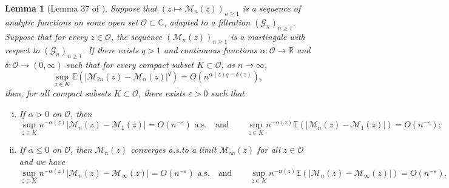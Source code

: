 \documentclass[11pt]{article}
\newtheorem{lemma}[theorem]{Lemma}
\numberwithin{equation}{section}
\def\vp{\varepsilon}
\def \R{\mathbb {R}}
\def \C{\mathbb{C}}
\def\E{\mathbb{E}}
\begin{document}
\begin{lemma}[Lemma 37 of \cite{Sen21}]\label{lemme 37}
	Suppose that $(z \mapsto \mathcal{M}_n(z))_{n\ge 1}$ is a sequence of analytic functions on some open set $\mathcal{O} \subset \C$, adapted to a filtration $(\mathcal{G}_n)_{n\ge 1}$. Suppose that for every $z \in \mathcal{O}$, the sequence $(\mathcal{M}_n(z))_{n\ge 1}$ is a martingale with respect to $(\mathcal{G}_n)_{n\ge 1}$. If there exists $q>1$ and continuous functions $\alpha:\mathcal{O} \to \R$ and $\delta: \mathcal{O} \to (0, \infty)$ such that for every compact subset $K \subset \mathcal{O}$, as $n\to \infty$,
	\[
	\sup_{z \in K}\E\left( \vert \mathcal{M}_{2n}(z)-\mathcal{M}_n(z) \vert^q \right) = O \left( n^{\alpha(z) q- \delta(z) }\right),
	\]
	then, for all compact subsets $K \subset \mathcal{O}$, there exists $\vp>0$ such that
	\begin{enumerate}[(i)]
		\item \label{item i lemme 37} If $\alpha>0$ on $\mathcal{O}$, then 
		\[
		\sup_{z \in K} n^{-\alpha(z)} \vert \mathcal{M}_n(z) - \mathcal{M}_1(z) \vert = O(n^{-\vp}) \text{ a.s.}\quad \text{and} \qquad  \sup_{z \in K} n^{-\alpha(z)}  \E\left(\vert \mathcal{M}_n(z) - \mathcal{M}_1(z) \vert  \right) = O(n^{-\vp});
		\]
		\item \label{item ii lemma 37} If $\alpha\le 0$ on $\mathcal{O}$, then $\mathcal{M}_n(z)$ converges a.s.\@ to a limit $\mathcal{M}_\infty(z)$ for all $z \in \mathcal{O}$ and we have 
		\[
		\sup_{z \in K} n^{-\alpha(z)} \vert \mathcal{M}_n(z) - \mathcal{M}_\infty(z) \vert = O(n^{-\vp}) \text{ a.s.}\quad \text{and} \qquad  \sup_{z \in K} n^{-\alpha(z)}  \E\left(\vert \mathcal{M}_n(z) - \mathcal{M}_\infty(z) \vert  \right) = O(n^{-\vp}).
		\]
	\end{enumerate}
\end{lemma}
\end{document}
